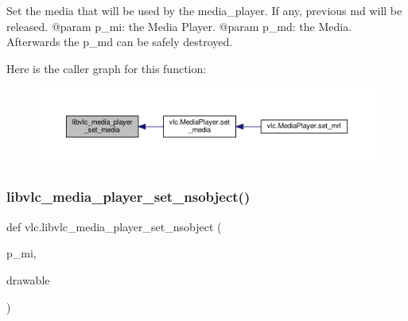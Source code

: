 \begin{DoxyVerb}Set the media that will be used by the media_player. If any,
previous md will be released.
@param p_mi: the Media Player.
@param p_md: the Media. Afterwards the p_md can be safely destroyed.
\end{DoxyVerb}
 Here is the caller graph for this function\+:
\nopagebreak
\begin{figure}[H]
\begin{center}
\leavevmode
\includegraphics[width=350pt]{namespacevlc_ad66d2344f5584cd004b224120ade9077_icgraph}
\end{center}
\end{figure}
\mbox{\label{namespacevlc_aaf2252c49a6e14c5fbcab04065b8b6f5}} 
\subsubsection{\texorpdfstring{libvlc\+\_\+media\+\_\+player\+\_\+set\+\_\+nsobject()}{libvlc\_media\_player\_set\_nsobject()}}
{\footnotesize\ttfamily def vlc.\+libvlc\+\_\+media\+\_\+player\+\_\+set\+\_\+nsobject (\begin{DoxyParamCaption}\item[{}]{p\+\_\+mi,  }\item[{}]{drawable }\end{DoxyParamCaption})}

